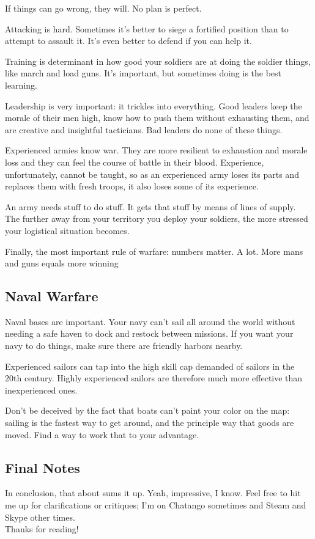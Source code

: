 \documentclass[11 pt]{scrartcl}
\begin{document}
If things can go wrong, they will. No plan is perfect.

Attacking is hard. Sometimes it’s better to siege a fortified position than to attempt to assault it. It’s even better to defend if you can help it.

Training is determinant in how good your soldiers are at doing the soldier things, like march and load guns. It’s important, but sometimes doing is the best learning.

Leadership is very important: it trickles into everything. Good leaders keep the morale of their men high, know how to push them without exhausting them, and are creative and insightful tacticians. Bad leaders do none of these things.

Experienced armies know war. They are more resilient to exhaustion and morale loss and they can feel the course of battle in their blood. Experience, unfortunately, cannot be taught, so as an experienced army loses its parts and replaces them with fresh troops, it also loses some of its experience.

An army needs stuff to do stuff. It gets that stuff by means of lines of supply. The further away from your territory you deploy your soldiers, the more stressed your logistical situation becomes.

Finally, the most important rule of warfare: numbers matter. A lot. More mans and guns equals more winning

\subsection{Naval Warfare}

Naval bases are important. Your navy can’t sail all around the world without needing a safe haven to dock and restock between missions. If you want your navy to do things, make sure there are friendly harbors nearby.

Experienced sailors can tap into the high skill cap demanded of sailors in the 20th century. Highly experienced sailors are therefore much more effective than inexperienced ones.

Don’t be deceived by the fact that boats can’t paint your color on the map: sailing is the fastest way to get around, and the principle way that goods are moved. Find a way to work that to your advantage.

\subsection{Final Notes}

In conclusion, that about sums it up. Yeah, impressive, I know. Feel free to hit me up for clarifications or critiques; I'm on Chatango sometimes and Steam and Skype other times.\\

Thanks for reading!
\end{document}
